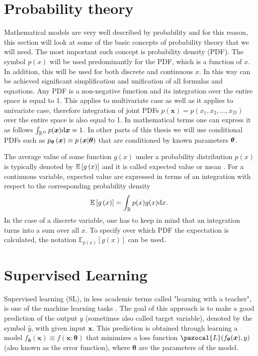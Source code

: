 \section{Probability theory}
Mathematical models are very well described by probability and for this reason, this section will look at some of the basic concepts of probability theory that we will need. The most important such concept is probability density (PDF). The symbol $p(x)$ will be used predominantly for the PDF, which is a function of $x$.  In addition, this will be used for both discrete and continuous $x$. In this way can be achieved significant simplification and unification of all formulas and equations. Any PDF is a non-negative function and its integration over the entire space is equal to 1. This applies to multivariate case as well as it applies to univariate case, therefore integration of joint PDFs $p(\boldsymbol{x}) = p\left(x_1, x_2, \dots, x_D\right)$ over the entire space is also equal to 1. In mathematical terms one can express it as follows $\int_{\mathbb{R}^D}p(\boldsymbol{x})\mathrm{d}{\boldsymbol{x}} = 1$. In other parts of this thesis we will use conditional PDFs such as $p_{\boldsymbol{\theta}}\left(\boldsymbol{x}\right) \equiv p\left(\boldsymbol{x}|\boldsymbol{\theta}\right)  $ that are conditioned by known parameters $\boldsymbol{\theta}$. 

The average value of some function $g(x)$ under a probability distribution $p(x)$ is typically denoted by $\mathbb{E}\left[ g\left(x\right) \right]$ and it is called expected value or mean \cite{bishop}. For a continuous variable, expected value are expressed in terms of an integration with respect to the corresponding probability density
\begin{equation}
	\mathbb{E}\left[ g\left(x\right) \right] = \int_{\mathbb{R}} p(x)g(x)\mathrm{d}{x}.
\end{equation} 
In the case of a discrete variable, one has to keep in mind that an integration turns into a sum over all $x$. To specify over which PDF the expectation is calculated, the notation $\mathbb{E}_{p(x)}\left[g\left(x\right)\right]$ can be used.

\section{Supervised Learning}
Supervised learning (SL), in less academic terms called "learning with a teacher", is one of the machine learning tasks  \cite{supervised}.  The goal of this approach is to make a good prediction of the output $y$ (sometimes also called target variable), denoted by the symbol $\hat{y}$, with given input $\boldsymbol{x}$. This prediction is obtained through learning a model $f_{\boldsymbol{\theta}}\left(\boldsymbol{x}\right)\equiv f\left(\boldsymbol{x}; \boldsymbol{\theta}\right)$ that minimizes a loss function  $\pazocal{L}(f_{\boldsymbol{\theta}}(\boldsymbol{x}), y)$ (also known as the error function), where $\boldsymbol{\theta}$ are the parameters of the model. 

